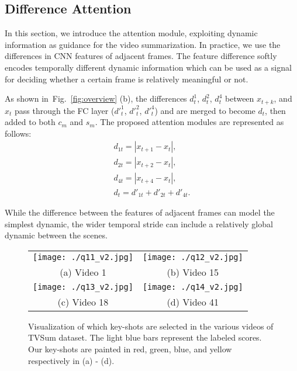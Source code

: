 \documentclass[letterpaper]{article} \usepackage{aaai19}  \usepackage{times}  \usepackage{helvet}  \usepackage{courier}  \usepackage{url}  \usepackage{graphicx}  \frenchspacing  \setlength{\pdfpagewidth}{8.5in}  \setlength{\pdfpageheight}{11in}
\newcommand{\figref}[1]{Fig.~\ref{#1}}
\begin{document}
\subsection{Difference Attention}

In this section, we introduce the attention module, exploiting dynamic information as guidance for the video summarization. In practice, we use the differences in CNN features of adjacent frames. The feature difference softly encodes temporally different dynamic information which can be used as a signal for deciding whether a certain frame is relatively meaningful or not.

As shown in~\figref{fig:overview} (b), the differences $d^1_t$, $d^2_t$, $d^4_t$ between $x_{t+k}$, and $x_t$ pass through the FC layer ($d'^1_t$, $d'^2_t$, $d'^4_t$) and are merged to become $d_t$, then added to both $c_{m}$ and $s_{m}$. The proposed attention modules are represented as follows:
\begin{eqnarray}
d_{1t} = |x_{t+1} - x_t|,\\
d_{2t} = |x_{t+2} - x_t|,\\
d_{4t} = |x_{t+4} - x_t|,\\
d_t = d'_{1t} + d'_{2t} + d'_{4t}.
\label{equ:diff}
\end{eqnarray}

While the difference between the features of adjacent frames can model the simplest dynamic, the wider temporal stride can include a relatively global dynamic between the scenes.







\begin{figure*}[t]
\begin{center}
\def\arraystretch{1.1}
\begin{tabular}{@{}c@{\hskip 0.01\linewidth}c@{}}

    \texttt{[image: ./q11\_v2.jpg]}&
    \texttt{[image: ./q12\_v2.jpg]}\\

{(a) Video 1} & {(b) Video 15}\\


    \texttt{[image: ./q13\_v2.jpg]}&
    \texttt{[image: ./q14\_v2.jpg]}\\

{(c) Video 18} & {(d) Video 41}
\end{tabular}
\end{center}
\caption{Visualization of which key-shots are selected in the various videos of TVSum dataset. The light blue bars represent the labeled scores. Our key-shots are painted in red, green, blue, and yellow respectively in (a) - (d).}
\label{fig:visual}
\end{figure*}
\end{document}
